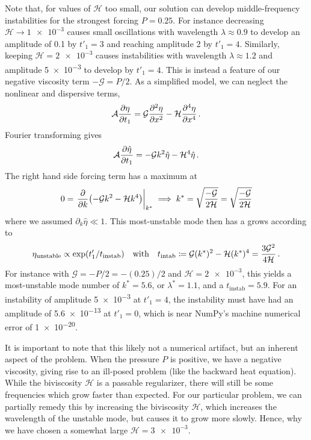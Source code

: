 \documentclass{jfm}
\begin{document}
Note that, for values of $\mathcal{H}$ too small, our solution can
develop middle-frequency instabilities for the strongest forcing
$P=0.25$.
For instance decreasing $\mathcal{H} \to \num{1e-3}$ causes small
oscillations with wavelength $\lambda \approx 0.9$ to develop an
amplitude of \num{0.1} by $t'_1=3$ and reaching amplitude \num{2} by
$t'_1 = 4$.
Similarly, keeping $\mathcal{H} = \num{2e-3}$ causes instabilities with
wavelength $\lambda \approx 1.2$ and amplitude \num{5e-3} to develop by
$t'_1=4$.
This is instead a feature of our negative viscosity term $-\mathcal{G} =
P/2$.
As a simplified model, we can neglect the nonlinear and dispersive
terms,
\begin{equation}
  \mathcal{A} \pdv{\eta}{t_1} = \mathcal{G} \pdv[2]{\eta}{x} -
  \mathcal{H} \pdv[4]{\eta}{x} \,.
\end{equation}
Fourier transforming gives
\begin{equation}
  \mathcal{A} \pdv{\hat{\eta}}{t_1} = -\mathcal{G} k^2 \hat{\eta} -
  \mathcal{H} ^4 \hat{\eta} \,.
\end{equation}
The right hand side forcing term has a maximum at
\begin{equation}
  0 = \eval{\pdv{k} \pqty{-\mathcal{G} k^2 - \mathcal{H} k^4}}_{k^*}
  \implies k^* = \sqrt{\frac{-\mathcal{G}}{2\mathcal{H}}}
  = \sqrt{\frac{-\mathcal{G}}{2\mathcal{H}}}
\end{equation}
where we assumed $\partial_k \hat{\eta} \ll 1$.
This most-unstable mode then has a grows according to
\begin{equation}
  \eta_{\text{unstable}} \propto \exp(t'_1/t_{\text{instab}})
  \qq{with}
  t_{\text{intab}} \coloneqq \mathcal{G} (k^*)^2 - \mathcal{H} (k^*)^4
  = \frac{3\mathcal{G}^2}{4 \mathcal{H}} \,.
\end{equation}
For instance with $\mathcal{G} = -P/2 = -(0.25)/2$ and $\mathcal{H} =
\num{2e-3}$, this yields a most-unstable mode number of $k^* =
\num{5.6}$, or $\lambda^* = \num{1.1}$, and a $t_{\text{instab}} = 5.9$.
For an instability of amplitude \num{5e-3} at $t'_1 = 4$, the
instability must have had an amplitude of \num{5.6e-13} at $t'_1 = 0$,
which is near NumPy's machine numerical error of \num{1e-20}.

It is important to note that this likely not a numerical artifact, but
an inherent aspect of the problem.
When the pressure $P$ is positive, we have a negative viscosity, giving
rise to an ill-posed problem (\eg like the backward heat equation).
While the biviscosity $\mathcal{H}$ is a passable regularizer, there
will still be some frequencies which grow faster than expected.
For our particular problem, we can partially remedy this by increasing
the biviscosity $\mathcal{H}$, which increases the wavelength of the
unstable mode, but causes it to grow more slowly.
Hence, why we have chosen a somewhat large $\mathcal{H} = \num{3e-3}$.
\end{document}
